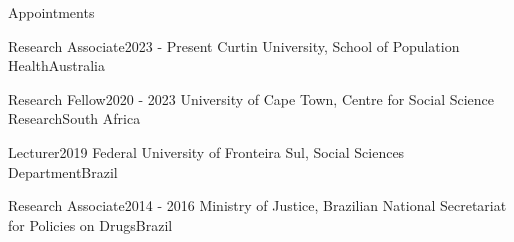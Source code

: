 \begin{rSection}{Appointments}

\begin{rSubsection}
{Research Associate}{2023 - Present}
{Curtin University, School of Population Health}{Australia}\par
\end{rSubsection}

\begin{rSubsection}
{Research Fellow}{2020 - 2023}
{University of Cape Town, Centre for Social Science Research}{South Africa}\par
\end{rSubsection}

\begin{rSubsection}
{Lecturer}{2019}
{Federal University of Fronteira Sul, Social Sciences Department}{Brazil}\par
\end{rSubsection}

\begin{rSubsection}
{Research Associate}{2014 - 2016}
{Ministry of Justice, Brazilian National Secretariat for Policies on Drugs}{Brazil}\par
\end{rSubsection}

\end{rSection}